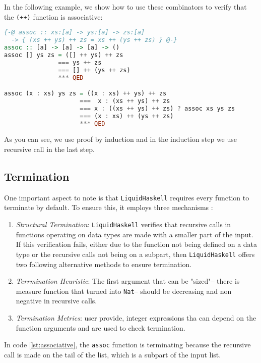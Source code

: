 \documentclass[]{rptuseminar}
\begin{document}
In the following example, we show how to use these combinators to verify that the \texttt{(++)} function is associative:


\begin{lstlisting}[language=haskell, label={lst:associative}]
{-@ assoc :: xs:[a] -> ys:[a] -> zs:[a] 
  -> { (xs ++ ys) ++ zs = xs ++ (ys ++ zs) } @-}
assoc :: [a] -> [a] -> [a] -> ()
assoc [] ys zs = ([] ++ ys) ++ zs
               === ys ++ zs
               === [] ++ (ys ++ zs)
               *** QED

assoc (x : xs) ys zs = ((x : xs) ++ ys) ++ zs
                     ===  x : (xs ++ ys) ++ zs
                     === x : ((xs ++ ys) ++ zs) ? assoc xs ys zs
                     === (x : xs) ++ (ys ++ zs)
                     *** QED
\end{lstlisting}
\vspace{1em}

As you can see, we use proof by induction and in the induction step we use recursive call in the last step.
\subsection{Termination}
One important aspect to note is that \texttt{LiquidHaskell} requires every function to terminate by default. 
To ensure this, it employs three mechanisms \cite{niki_lecture_2024}:  
\begin{enumerate}
  \item \textit{Structural Termination}: \texttt{LiquidHaskell} verifies that recursive calls in functions operating on data types are made with a smaller part of the input. 
    If this verification fails, either due to the function not being defined on a data type or the recursive calls not being on a subpart, then \texttt{LiquidHaskell} offers two following alternative methods to ensure termination.
  \item \textit{Terrmination Heuristic}: The first argument that can be "sized"-- there is measure function that turned into \texttt{Nat}--
    should be decreasing and non negative in recursive calls.
  \item \textit{Termination Metrics}: user provide, integer expressions tha can depend on the function arguments and are used to check termination.
\end{enumerate}
In code \ref{lst:associative}, the \texttt{assoc} function is terminating because the recursive call is made on the tail of the list, which is a subpart of the input list.
\end{document}
